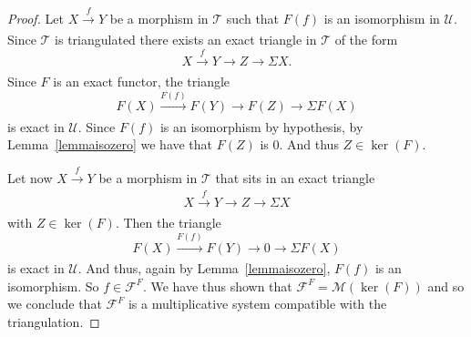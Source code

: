 \documentclass[11pt,reqno,a4paper]{amsart}
\theoremstyle{definition}
\theoremstyle{remark}
\def\nameit#1{\textrm{#1}~}
\def\lemx{\nameit{Lemma}}
\newcommand{\T}{\mathcal{T}}
\newcommand{\U}{\mathcal{U}}
\newcommand{\0}{\mathbf{0}}
\renewcommand{\1}{\mathbf{1}}
\newcommand{\aar}[2][]{\xrightarrow[#1]{#2}}
\begin{document}
\begin{proof}
    Let $X\aar{f} Y$ be a morphism in $\T$ such that $F(f)$ is an isomorphism in $\U$. Since $\T$ is triangulated there exists an exact triangle in $\T$ of the form
    $$X \aar{f} Y \aar{} Z \aar{} \Sigma X.$$
    Since $F$ is an exact functor, the triangle
     $$F(X) \aar{F(f)} F(Y) \aar{} F(Z) \aar{} \Sigma F(X)$$
     is exact in $\U$. Since $F(f)$ is an isomorphism by hypothesis, by \lemx \ref{lemmaisozero} we have that $F(Z)$ is $0$. And thus $Z\in \ker(F)$.

     Let now $X\aar{f} Y$ be a morphism in $\T$ that sits in an exact triangle
     $$X \aar{f} Y \aar{} Z \aar{} \Sigma X$$
     with $Z\in \ker(F)$. Then the triangle
     $$F(X) \aar{F(f)} F(Y) \aar{} 0 \aar{} \Sigma F(X)$$
     is exact in $\U$. And thus, again by \lemx\ref{lemmaisozero}, $F(f)$ is an isomorphism. So $f\in \mathcal{F}^F$. We have thus shown that $\mathcal{F}^F=\mathcal{M}(\ker(F))$ and so we conclude that $\mathcal{F}^F$ is a multiplicative system compatible with the triangulation.
    \end{proof}
\end{document}
